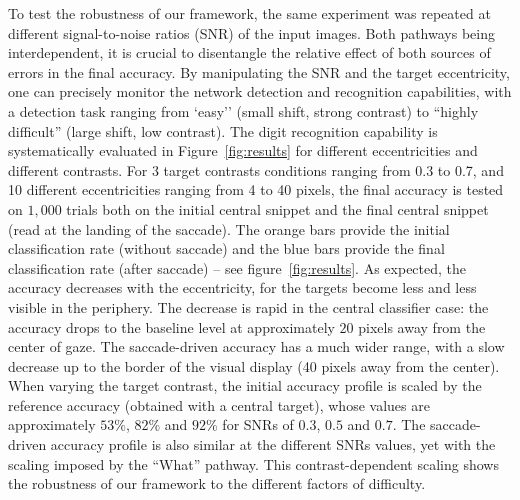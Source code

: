 To test the robustness of our framework, the same experiment was repeated at different signal-to-noise ratios (SNR) of the input images. Both pathways being interdependent, it is crucial to disentangle the relative effect of both sources of errors in the final accuracy. By manipulating the SNR and the target eccentricity, one can precisely monitor the network detection and recognition capabilities, with a detection task ranging from `easy'' (small shift, strong contrast) to ``highly difficult'' (large shift, low contrast). The  digit recognition capability is systematically evaluated in Figure~\ref{fig:results} for different eccentricities and different contrasts.
For 3 target contrasts conditions ranging from 0.3 to 0.7, and 10 different eccentricities ranging from 4 to 40 pixels, the final accuracy is tested on $1,000$ trials both on the initial central snippet and the final central snippet (read at the landing of the saccade).
The orange bars provide the initial classification rate (without saccade) and the blue bars provide the final classification rate (after saccade) -- see figure~\ref{fig:results}.  As expected, the accuracy decreases with the eccentricity, for the targets become less and less visible in the periphery. The decrease is rapid in the central classifier case: the accuracy drops to the baseline level
at approximately $20$ pixels away from the center of gaze. The saccade-driven accuracy has a much wider range, with a slow decrease up to the border of the visual display (40 pixels away from the center).
When varying the target contrast, the initial accuracy profile is scaled by the reference accuracy (obtained with a central target), whose values are approximately $53\%$, $82\%$ and $92\%$ for SNRs of $0.3$, $0.5$ and $0.7$. The saccade-driven accuracy profile is also similar at the different SNRs values, yet with the scaling imposed by the ``What'' pathway. This contrast-dependent scaling shows the robustness of our framework to the different factors of difficulty.

